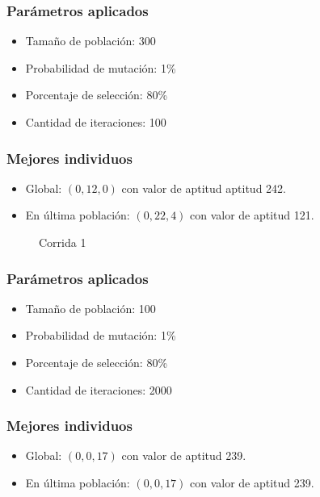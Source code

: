 \documentclass{conaiisi}
\begin{document}
\subsubsection*{Parámetros aplicados}

\begin{multicols}{2}
\begin{itemize}
	\item Tamaño de población: 300
	\item Probabilidad de mutación: 1\%
	\item Porcentaje de selección: 80\%
	\item Cantidad de iteraciones: 100
\end{itemize}
\end{multicols}

\subsubsection*{Mejores individuos}
\begin{itemize}
	\item Global: $(0, 12, 0)$ con valor de aptitud aptitud 242.
	\item En última población: $(0, 22, 4)$ con valor de aptitud 121.
\end{itemize}

\begin{figure}[h!]
\centering
{}
\caption{Corrida 1}
\end{figure}

\newpage

\subsubsection*{Parámetros aplicados}

\begin{multicols}{2}
\begin{itemize}
	\item Tamaño de población: 100
	\item Probabilidad de mutación: 1\%
	\item Porcentaje de selección: 80\%
	\item Cantidad de iteraciones: 2000
\end{itemize}
\end{multicols}

\subsubsection*{Mejores individuos}
\begin{itemize}
	\item Global: $(0, 0, 17)$ con valor de aptitud 239.
	\item En última población: $(0, 0, 17)$ con valor de aptitud 239.
\end{itemize}
\end{document}

